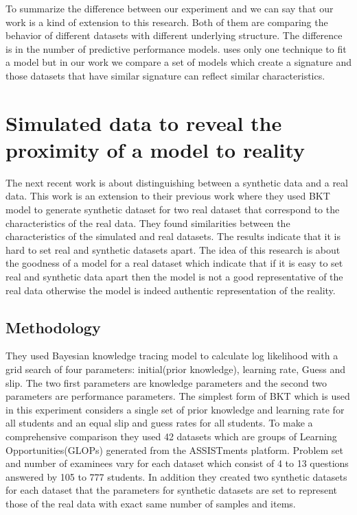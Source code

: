 To summarize the difference between our experiment and \citep{Desmarais2010} we can say that our work is a kind of extension to this research. Both of them are comparing the behavior of different datasets with different underlying structure. The difference is in the number of predictive performance models. \citep{Desmarais2010} uses only one technique to fit a model but in our work we compare a set of models which create a signature and those datasets that have similar signature can reflect similar characteristics.

\section{Simulated data to reveal the proximity of a model to reality}

The next recent work \citep{Rosenberg2015} is about distinguishing between a synthetic data and a real data. This work is an extension to their previous work \citep{Rosenberg2014} where they used BKT model to generate synthetic dataset for two real dataset that correspond to the characteristics of the real data. They found similarities between the characteristics of the simulated and real datasets. The results indicate that it is hard to set real and synthetic datasets apart. The idea of this research \citep{Rosenberg2015} is about the goodness of a model for a real dataset which indicate that if it is easy to set real and synthetic data apart then the model is not a good representative of the real data otherwise the model is indeed authentic representation of the reality.

\subsection{Methodology}
They used Bayesian knowledge tracing model to calculate log likelihood with a grid search of four parameters: initial(prior knowledge), learning rate, Guess and slip. The two first parameters are knowledge parameters and the second two parameters are performance parameters. The simplest form of BKT which is used in this experiment considers a single set of prior knowledge and  learning rate for all students and an equal slip and guess rates for all students.
To make a comprehensive comparison they used 42 datasets which are groups of Learning Opportunities(GLOPs) generated from the ASSISTments platform. Problem set and number of examinees vary for each dataset which consist of 4 to 13 questions answered by 105 to 777 students. In addition they created two synthetic datasets for each dataset that the parameters for synthetic datasets are set to represent those of the real data with exact same number of samples and items. 


